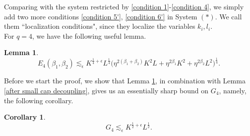 \documentclass[11pt]{amsart}
\numberwithin{equation}{section}
\newtheorem{corollary}{Corollary}[theorem]
\newtheorem{lemma}[theorem]{Lemma}
\theoremstyle{definition}
\theoremstyle{proposition}
\begin{document}

Comparing with the system restricted by \eqref{condition 1}-\eqref{condition 4}, we simply add two more conditions \eqref{condition 5'}, \eqref{condition 6'} in System $(*)$. We call them ``localization conditions", since they localize the variables $k_i,l_i$. \\


For $q=4$, we have the following useful lemma.
\begin{lemma}  \label{Lemma number of solutions q=4}
\begin{equation} \label{number of solutions q=4}
E_4(\beta_1,\beta_2) \lesssim_\epsilon K^{\frac{1}{4}+\epsilon}L^{\frac{1}{4}} \Big( \eta^{2(\beta_1+\beta_2)}K^2 L+\eta^{2\beta_1}K^2+\eta^{2\beta_2}L^2 \Big)^{\frac{1}{4}}.    
\end{equation}
\end{lemma}
Before we start the proof, we show that Lemma \ref{Lemma number of solutions q=4}, in combination with Lemma \ref{after small cap decoupling}, gives us an essentially sharp bound on $G_4$, namely, the following corollary. 
\begin{corollary} \label{G_4}
\[
G_4 \lesssim_\epsilon K^{\frac{1}{2}+\epsilon}L^{\frac{1}{2}}.
\]    
\end{corollary} 
\end{document}
